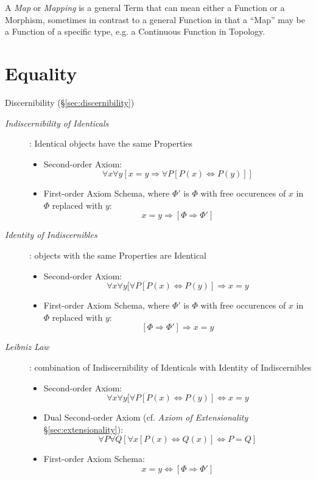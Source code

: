 A \emph{Map} or \emph{Mapping} is a general Term that can mean either
a Function or a Morphism, sometimes in contrast to a general Function
in that a ``Map'' may be a Function of a specific type, e.g. a
Continuous Function in Topology.



\section{Equality}\label{sec:equality}\cite{baez15}

Discernibility (\S\ref{sec:discernibility})

\begin{description}

\item[\emph{Indiscernibility of Identicals}]: Identical objects have
the same Properties
\begin{itemize}
    \item Second-order Axiom:
    \[
        \forall x \forall y
        [ x = y \Rightarrow \forall P [ P(x) \Leftrightarrow P(y) ]]
    \]
    \item First-order Axiom Schema, where $\Phi'$ is $\Phi$ with free
      occurences of $x$ in $\Phi$ replaced with $y$:
    \[
        x = y \Rightarrow [\Phi \Rightarrow \Phi']
    \]
\end{itemize}

\item[\emph{Identity of Indiscernibles}]: objects with the same Properties
are Identical
\begin{itemize}
    \item Second-order Axiom:
    \[
        \forall x \forall y
        [ \forall P [ P(x) \Leftrightarrow P(y) ] \Rightarrow x = y
    \]
    \item First-order Axiom Schema, where $\Phi'$ is $\Phi$ with free
      occurences of $x$ in $\Phi$ replaced with $y$:
    \[
        [\Phi \Rightarrow \Phi'] \Rightarrow x = y
    \]
\end{itemize}

\item[\emph{Leibniz Law}]: combination of Indiscernibility of
  Identicals with Identity of Indiscernibles
\begin{itemize}
    \item Second-order Axiom:
    \[
        \forall x \forall y
        [ \forall P [ P(x) \Leftrightarrow P(y) ] \Leftrightarrow x = y
    \]
    \item Dual Second-order Axiom (cf. \emph{Axiom of Extensionality}
      \S\ref{sec:extensionality}):
    \[
        \forall P \forall Q
        [ \forall x [P(x) \Leftrightarrow Q(x)] \Leftrightarrow P = Q ]
    \]
    \item First-order Axiom Schema:
    \[
        x = y \Leftrightarrow [\Phi \Rightarrow \Phi']
    \]
\end{itemize}


\end{description}



